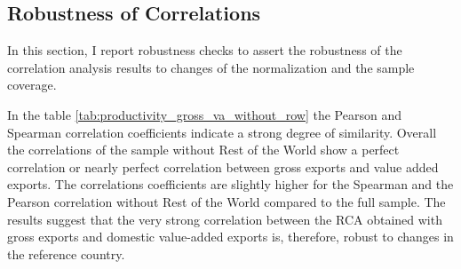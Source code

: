  \subsection{Robustness of Correlations}
 In this section,  I report robustness checks  to assert the robustness of the correlation analysis results to changes of the normalization and the sample coverage. \par
In the table \cref{tab:productivity_gross_va_without_row} the Pearson and Spearman correlation coefficients indicate a strong degree of similarity. Overall the correlations of the sample without Rest of the World show a perfect correlation or nearly perfect correlation between gross exports and value added exports. The correlations coefficients are slightly higher for the Spearman and the Pearson correlation without Rest of the World compared to the full sample. The results suggest that the very strong correlation between the RCA obtained with gross exports and domestic value-added exports is, therefore, robust to changes in the reference country.  
